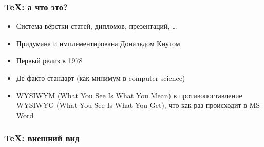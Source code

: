 
\begin{frame}

\frametitle{\TeX: а что это?}

\begin{itemize}[<+->]
    \item Система вёрстки статей, дипломов, презентаций, \dots
    \item Придумана и имплементирована Дональдом Кнутом
    \item Первый релиз в 1978
    \item Де-факто стандарт (как минимум в computer science)
    \item WYSIWYM (What You See Is What You Mean) 
    в противопоставление WYSIWYG (What You See Is What You Get),
    что как раз происходит в MS Word
\end{itemize}

\end{frame}


\begin{frame}

\frametitle{\TeX: внешний вид}

{

\captionsetup[subfloat]{labelformat=empty}

\begin{figure}[c]
  \centering
  \quad
\end{figure}

}

\end{frame}
